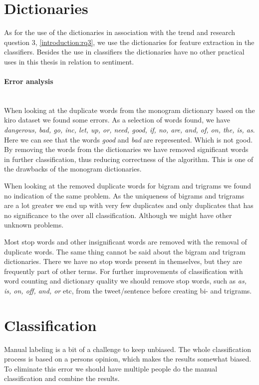\section{Dictionaries}\label{results:dictionaries}
As for the use of the dictionaries in association with the trend and research
question 3, \ref{introduction:rq3}, we use the dictionaries for feature
extraction in the classifiers. Besides the use in classifiers the dictionaries
have no other practical uses in this thesis in relation to sentiment.

\paragraph{Error analysis}
\hspace{0pt}\\
When looking at the duplicate words from the monogram dictionary based on the
kiro dataset we found some errors.
As a selection of words found, we have \textit{dangerous, bad, go, inc, let, up,
or, need, good, if, no, are, and, of, on, the,
is, as}.
Here we can see that the words \textit{good} and \textit{bad} are represented.
Which is not good. By removing the words from the dictionaries we have removed
significant words in further classification, thus reducing correctness of the
algorithm. This is one of the drawbacks of the monogram dictionaries.

When looking at the removed duplicate words for bigram and trigrams we found no
indication of the same problem. As the uniqueness of bigrams and trigrams are a
lot greater we end up with very few duplicates and only duplicates that has no
significance to the over all classification. Although we might have other
unknown problems.

Most stop words and other insignificant words are removed with the removal of
duplicate words. The same thing cannot be said about the bigram and trigram
dictionaries. There we have no stop words present in themselves, but they are
frequently part of other terms. For further improvements of classification with
word counting and dictionary quality we should remove
stop words, such as \textit{as, is, on, off, and, or} etc, from the
tweet/sentence before creating bi- and trigrams.
%


\section{Classification}\label{results:classification}
Manual labeling is a bit of a challenge to keep unbiased. The whole
classification process is based on a persons opinion, which makes the results
somewhat biased. To eliminate this error we should have multiple people do the
manual classification and combine the results.  

